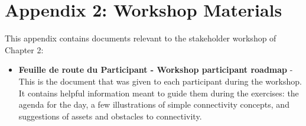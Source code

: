 
\chapter*{\textbf{Appendix 2: Workshop Materials \\ \hspace{1em}}}

\setcounter{chapter}{4}
\setcounter{table}{0}
\setcounter{figure}{0}

This appendix contains documents relevant to the stakeholder workshop of Chapter 2: 
\begin{itemize}
  \item \textbf{Feuille de route du Participant - Workshop participant roadmap} - This is the document that was given to each participant during the workshop. It contains helpful information meant to guide them during the exercises: the agenda for the day, a few illustrations of simple connectivity concepts, and suggestions of assets and obstacles to connectivity.
\end{itemize}


% 
% 